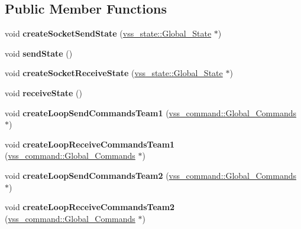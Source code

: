 \subsection*{Public Member Functions}
\begin{DoxyCompactItemize}
\item 
void {\bfseries create\+Socket\+Send\+State} (\hyperlink{classvss__state_1_1Global__State}{vss\+\_\+state\+::\+Global\+\_\+\+State} $\ast$)\hypertarget{classInterface_a76752c5d305865777405fd8f36e4b9fd}{}\label{classInterface_a76752c5d305865777405fd8f36e4b9fd}

\item 
void {\bfseries send\+State} ()\hypertarget{classInterface_a9de875408d6ec60ef952d167ab244819}{}\label{classInterface_a9de875408d6ec60ef952d167ab244819}

\item 
void {\bfseries create\+Socket\+Receive\+State} (\hyperlink{classvss__state_1_1Global__State}{vss\+\_\+state\+::\+Global\+\_\+\+State} $\ast$)\hypertarget{classInterface_ad7466b43bc53a4cd5225c280cf81b2cc}{}\label{classInterface_ad7466b43bc53a4cd5225c280cf81b2cc}

\item 
void {\bfseries receive\+State} ()\hypertarget{classInterface_abba50a9d10639aa5b2f4a45be31b4062}{}\label{classInterface_abba50a9d10639aa5b2f4a45be31b4062}

\item 
void {\bfseries create\+Loop\+Send\+Commands\+Team1} (\hyperlink{classvss__command_1_1Global__Commands}{vss\+\_\+command\+::\+Global\+\_\+\+Commands} $\ast$)\hypertarget{classInterface_a856aa7ba2462cb787bff454998ac03fa}{}\label{classInterface_a856aa7ba2462cb787bff454998ac03fa}

\item 
void {\bfseries create\+Loop\+Receive\+Commands\+Team1} (\hyperlink{classvss__command_1_1Global__Commands}{vss\+\_\+command\+::\+Global\+\_\+\+Commands} $\ast$)\hypertarget{classInterface_a9421fb07f3190cff0ab4198587de4b87}{}\label{classInterface_a9421fb07f3190cff0ab4198587de4b87}

\item 
void {\bfseries create\+Loop\+Send\+Commands\+Team2} (\hyperlink{classvss__command_1_1Global__Commands}{vss\+\_\+command\+::\+Global\+\_\+\+Commands} $\ast$)\hypertarget{classInterface_a59f5b2b5043433cbd42729baf84533e1}{}\label{classInterface_a59f5b2b5043433cbd42729baf84533e1}

\item 
void {\bfseries create\+Loop\+Receive\+Commands\+Team2} (\hyperlink{classvss__command_1_1Global__Commands}{vss\+\_\+command\+::\+Global\+\_\+\+Commands} $\ast$)\hypertarget{classInterface_aff3b574fe1147f93011c1deef6ec5505}{}\label{classInterface_aff3b574fe1147f93011c1deef6ec5505}


\end{DoxyCompactItemize}
